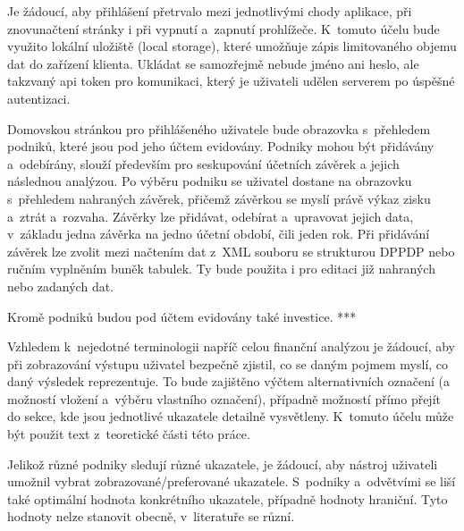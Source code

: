 Je žádoucí, aby přihlášení přetrvalo mezi jednotlivými chody aplikace, při znovunačtení stránky i při vypnutí a~zapnutí prohlížeče. K~tomuto účelu bude využito lokální uložiště (local storage), které umožňuje zápis limitovaného objemu dat do zařízení klienta. Ukládat se samozřejmě nebude jméno ani heslo, ale takzvaný api token pro komunikaci, který je uživateli udělen serverem po úspěšné autentizaci.

Domovskou stránkou pro přihlášeného uživatele bude obrazovka s~přehledem podniků, které jsou pod jeho účtem evidovány. Podniky mohou být přidávány a~odebírány, slouží především pro seskupování účetních závěrek a jejich následnou analýzou. Po výběru podniku se uživatel dostane na obrazovku s~přehledem nahraných závěrek, přičemž závěrkou se myslí právě výkaz zisku a~ztrát a~rozvaha. Závěrky lze přidávat, odebírat a~upravovat jejich data, v~základu jedna závěrka na jedno účetní období, čili jeden rok. Při přidávání závěrek lze zvolit mezi načtením dat z~XML souboru se strukturou DPPDP nebo ručním vyplněním buněk tabulek. Ty bude použita i pro editaci již nahraných nebo zadaných dat.

Kromě podniků budou pod účtem evidovány také investice. ***

Vzhledem k~nejedotné terminologii napříč celou finanční analýzou je žádoucí, aby při zobrazování výstupu uživatel bezpečně zjistil, co se daným pojmem myslí, co daný výsledek reprezentuje. To bude zajištěno výčtem alternativních označení (a možností vložení a~výběru vlastního označení), případně možností přímo přejít do sekce, kde jsou jednotlivé ukazatele detailně vysvětleny. K~tomuto účelu může být použit text z~teoretické části této práce.

Jelikož různé podniky sledují různé ukazatele, je žádoucí, aby nástroj uživateli umožnil vybrat zobrazované/preferované ukazatele. S~podniky a~odvětvími se liší také optimální hodnota konkrétního ukazatele, případně hodnoty hraniční. Tyto hodnoty nelze stanovit obecně, v~literatuře se různí.


